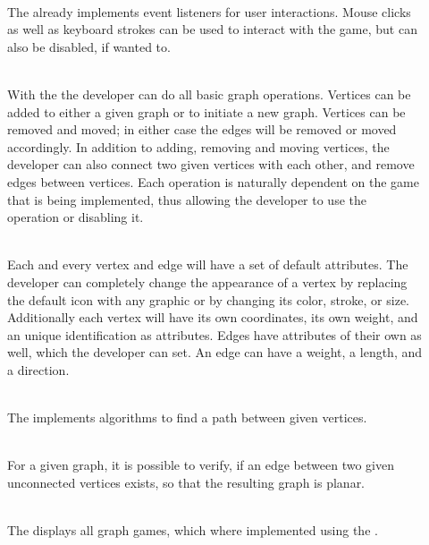 \begin{description}
	\item[] \textbf{} \\
	The {\graphioli}  already implements event listeners for user interactions. Mouse clicks as well as keyboard strokes can be used to interact with the game, but can also be disabled, if wanted to.
  	\item[] \textbf{}  \\
	With the {\graphioli} the developer can do all basic graph operations. Vertices can be added to either a given graph or to initiate a new graph. Vertices can be removed and moved; in either case the edges will be removed or moved accordingly. In addition to adding, removing and moving vertices, the developer can also connect two given vertices with each other, and remove edges between vertices. Each operation is naturally dependent on the game that is being implemented, thus allowing the developer to use the operation or disabling it.
	\item[] \textbf{}  \\
	Each and every vertex and edge will have a set of default attributes. The developer can completely change the appearance of a vertex by replacing the default icon with any graphic or by changing its color, stroke, or size. Additionally each vertex will have its own coordinates, its own weight, and an unique identification as attributes. Edges have attributes of their own as well, which the developer can set. An edge can have a weight, a length, and a direction.
	\item[] \textbf{}  \\
	The {\graphioli} implements algorithms to find a path between given vertices.
	\item[] \textbf{ }  \\
	For a given graph, it is possible to verify, if an edge between two given unconnected vertices exists, so that the resulting graph is planar. 
 	\item[] \textbf{}  \\
 	The  displays all graph games, which where implemented using the {\graphioli}.

\end{description}
